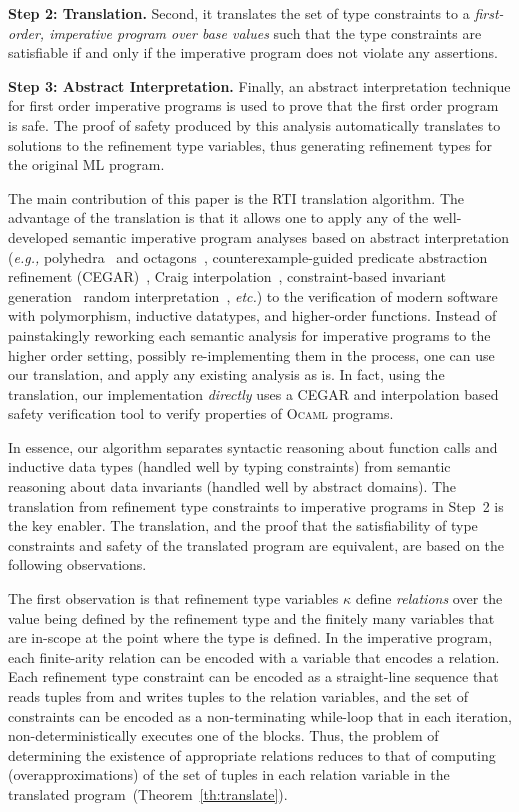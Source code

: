 \documentclass[nocopyrightspace]{sigplanconf}
\def\mypara#1{\smallskip\noindent\textbf{#1}}
\newcommand{\eg}{\textit{e.g.,}\xspace}
\def\etc{{\it etc.}}
\newcommand\ML{\textsc{ML}\xspace}
\newcommand\ocaml{\textsc{Ocaml}\xspace}
\newcommand{\kvar}{\kappa}
\begin{document}
\mypara{Step 2: Translation.}
Second, it translates the set of type constraints 
to a \emph{first-order, imperative program over base values}
such that the type constraints are satisfiable if and only if 
the imperative program does not violate any assertions.

\mypara{Step 3: Abstract Interpretation.}
Finally, an abstract interpretation technique for first order
imperative programs is used to prove that the first order 
program is safe.
The proof of safety produced by this analysis automatically
translates to solutions to the
refinement type variables, thus generating refinement types for the
original \ML program.

The main contribution of this paper is the RTI translation algorithm.
The advantage of the translation is that 
it allows one to apply any of the well-developed semantic 
imperative program analyses based on abstract interpretation (\eg 
polyhedra~\cite{CousotHalbwachs78} and octagons~\cite{CousotPLDI03}, 
counterexample-guided predicate abstraction refinement
(CEGAR)~\cite{SLAMPOPL02,HJMM04}, 
Craig interpolation~\cite{HJMM04,McMillan06}, 
constraint-based invariant
generation~\cite{Sankaranarayanan05,RybalchenkoVMCAI07}
random interpretation~\cite{Gulwani03}, 
\etc) 
to the verification of modern software with 
polymorphism, inductive datatypes, and higher-order functions.
Instead of painstakingly reworking each semantic analysis 
for imperative programs to the higher order setting,
possibly re-implementing them in the process, one 
can use our translation, and apply any existing analysis as is. 
In fact, using the translation, our implementation {\em directly} 
uses a CEGAR and interpolation based safety verification tool 
to verify properties of \ocaml programs.

In essence, our algorithm separates syntactic reasoning about function calls
and inductive data types (handled well by typing constraints) from
semantic reasoning about data invariants (handled well by abstract domains). 
The translation from refinement type constraints to 
imperative programs in Step~2 is the key enabler. 
The translation, and the proof that the satisfiability of type constraints and 
safety of the translated program are equivalent, are based on the following 
observations.

The first observation is that refinement type 
variables $\kvar$ define \emph{relations} over the value being 
defined by the refinement type
and the finitely many variables that are in-scope at the 
point where the type is defined.
In the imperative program, each finite-arity relation can be encoded 
with a variable that encodes a relation.
Each refinement type constraint can be encoded as a straight-line 
sequence that reads tuples from and writes tuples to the relation variables,
and the set of constraints can be encoded as a non-terminating while-loop
that in each iteration, non-deterministically executes 
one of the blocks.
Thus, the problem of determining the existence of appropriate relations
reduces to that of computing (overapproximations) of the set of tuples
in each relation variable in the translated
program~(Theorem~\ref{th:translate}). 
\end{document}
